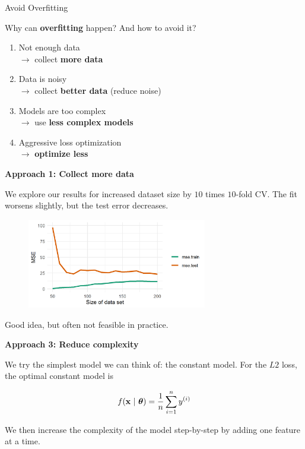 \documentclass[11pt,compress,t,notes=noshow, xcolor=table]{beamer}
\begin{document}
\begin{vbframe}{Avoid Overfitting} 

Why can \textbf{overfitting} happen? And how to avoid it?

\begin{enumerate}
\item Not enough data \\
$\to$ collect \textbf{more data} 
\item Data is noisy \\
$\to$ collect \textbf{better data} (reduce noise) 
\item Models are too complex \\
$\to$ use \textbf{less complex models}
\item Aggressive loss optimization \\
$\to$ \textbf{optimize less}
\end{enumerate}


\framebreak 

\textbf{Approach 1: Collect more data}

\lz 

We explore our results for increased dataset size by $10$ times $10$-fold CV.
The fit worsens slightly, but the test error decreases.

\begin{figure}
\includegraphics[width=0.7\textwidth]{figure/avoid_overfitting_01.png}\\
\end{figure}

Good idea, but often not feasible in practice.

\framebreak

\textbf{Approach 3: Reduce complexity}

\lz 

We try the simplest model we can think of: the constant model. For the $L2$ loss, the optimal constant model is

$$
f(\mathbf{x} ~|~ \bm{\theta}) = \frac{1}{n}\sum\limits_{i=1}^n y^{(i)}
$$

We then increase the complexity of the model step-by-step by adding one feature at a time.


\end{vbframe}
\end{document}
